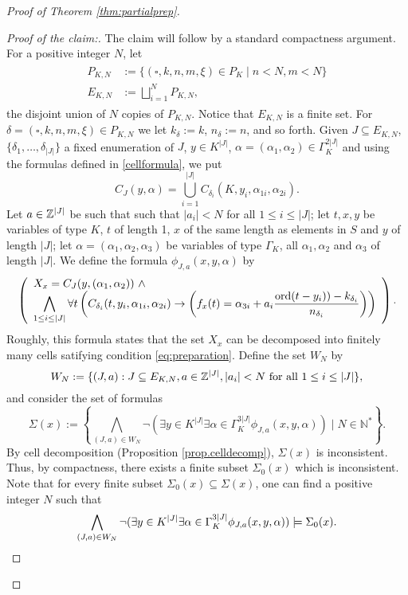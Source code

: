 \begin{proof}[Proof of Theorem \ref{thm:partialprep}]
\begin{proof}[Proof of the claim:]
The claim will follow by a standard compactness argument. For a positive integer $N$, let 
\begin{align}\label{defPK}
\begin{split}
P_{K,N}&:= \{(\square, k,n,m,\xi)\in P_K \mid n<N, m<N\}\\
E_{K,N} &:= \bigsqcup_{i=1}^N P_{K,N},
\end{split}
\end{align}
the disjoint union of $N$ copies of $P_{K,N}$. Notice that $E_{K,N}$ is a finite set. For $\delta=(\square, k,n,m,\xi)\in P_{K,N}$ we let $k_{\delta}:=k$, $n_\delta:=n$, and so forth. Given $J\subseteq E_{K,N}$, $\{\delta_1,\ldots,\delta_{|J|}\}$ a fixed enumeration of $J$, $y\in K^{|J|}$, $\alpha=(\alpha_1,\alpha_2)\in \Gamma_K^{2|J|}$ and using the formulas defined in \ref{cellformula}, we put 
\[C_J(y,\alpha)=\bigcup_{i=1}^{|J|} C_{\delta_i}(K,y_i,\alpha_{1i},\alpha_{2i}).
\]
Let $a\in{\mathbb Z}^{|J|}$ be such that such that $|a_i|<N$ for all $1\leq i\leq |J|$; let $t,x,y$ be variables of type $K$, $t$ of length 1, $x$ of the same length as elements in $S$ and $y$ of length $|J|$; let $\alpha=(\alpha_1,\alpha_2,\alpha_3)$ be variables of type $\Gamma_K$, all $\alpha_1,\alpha_2$ and $\alpha_3$ of length $|J|$. We define the formula $\phi_{J,a}(x,y,\alpha)$
by
\small
\begin{equation}\label{cellformula}
\left(\begin{array}{l}
X_x=C_J(y,(\alpha_1,\alpha_2))\ \wedge \\
\displaystyle\bigwedge_{1\leq i\leq |J|} \forall t \left( C_{\delta_i}(t,y_i,\alpha_{1i},\alpha_{2i})\to \left(f_x(t)=\alpha_{3i}+a_i\frac{\operatorname{ord}(t-y_i))-k_{\delta_i}}{n_{\delta_i}}\right)\right)\end{array}\right).\\
\end{equation}
\normalsize
Roughly, this formula states that the set $X_x$ can be decomposed into finitely many cells satifying condition \ref{eq:preparation}. Define the set $W_N$ by 
\begin{equation}\label{WN}
W_N:=\{(J,a): J\subseteq E_{K,N}, a\in {\mathbb Z}^{|J|}, |a_i|<N \text{ for all } 1\leq i\leq |J|\},
\end{equation}
and consider the set of formulas 
\[\Sigma(x):=\left\{ \bigwedge_{(J,a)\in W_N} \neg (\exists y\in K^{|J|}\exists \alpha\in \Gamma_{K}^{3|J|}\phi_{J,a}(x,y,\alpha)) \mid N\in\mathbb{N}^*\right\}.
\]
By cell decomposition (Proposition \ref{prop.celldecomp}), $\Sigma(x)$ is inconsistent. Thus, by compactness, there exists a finite subset $\Sigma_0(x)$ which is inconsistent. Note that for every finite subset $\Sigma_0(x)\subseteq\Sigma(x)$, one can find a positive integer $N$ such that 
\[\bigwedge_{(J,a)\in W_N} \neg (\exists y\in K^{|J|}\exists \alpha\in \Gamma_{K}^{3|J|}\phi_{J,a}(x,y,\alpha)) \models \Sigma_0(x).
\end{equation*}

\]
\end{proof}
\end{proof}

